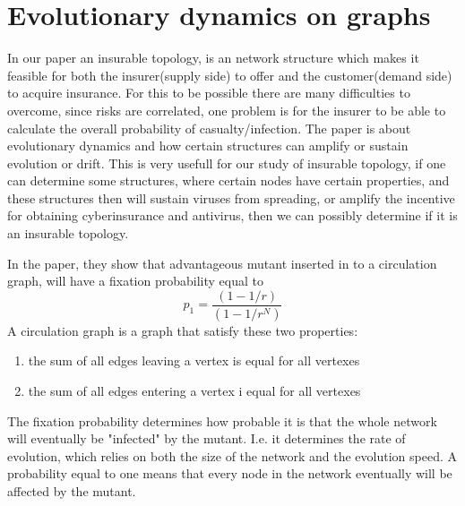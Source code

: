 \chapter{Evolutionary dynamics on graphs}
\label{chp:nature} 


In our paper an insurable topology, is an network structure which makes it feasible for both the
 insurer(supply side)  to offer and the customer(demand side) to acquire insurance.
 For this to be possible there are many  difficulties to overcome,  since risks are correlated, 
 one problem is for the insurer to be able to calculate the overall probability of casualty/infection.
 The paper \cite{lieberman2005evolutionary} is about evolutionary dynamics and how certain structures
can amplify or sustain evolution or drift. This is very usefull for our study of insurable topology, if one
can determine some structures, where certain nodes have certain properties, and these structures
then will sustain viruses from spreading, or amplify the incentive for obtaining cyberinsurance and
antivirus, then we can possibly determine if it is an insurable topology.

In the \cite{lieberman2005evolutionary} paper, they show that advantageous mutant inserted in to a
 circulation graph, will have a fixation probability equal to
\begin{equation}  p_{1}=\frac{(1-1/r)}{(1-1/r^{N})} \label{eq:fixation} \end{equation}
A circulation graph is a graph that satisfy these two properties:
\begin{enumerate}
\item the sum of all edges leaving a vertex is equal for all vertexes
\item the sum of all edges entering a vertex i equal for all vertexes
\end{enumerate}
The fixation probability determines how probable it is that the whole network will eventually be
"infected" by the mutant. I.e. it determines the rate of evolution, which relies on both the size of the
network and the evolution speed. 
A probability equal to one means that every node in the network eventually will be affected by the mutant.

